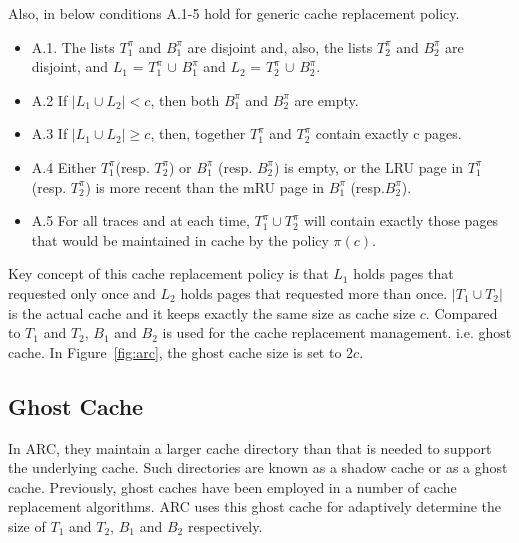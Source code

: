  
 Also, in below conditions A.1-5 hold for generic cache replacement policy.
 \vspace{0.2cm}
 \begin{itemize}
     \item A.1. The lists $T_1^\pi$ and $B_1^\pi$ are disjoint and, also, the lists $T_2^\pi$ and $B_2^\pi$ are disjoint, and 
     $L_1$ = $T_1^\pi$ $\cup$ $B_1^\pi$ and $L_2$ = $T_2^\pi$ $\cup$ $B_2^\pi$.
 \end{itemize}

\begin{itemize}
    \item A.2 If $|L_1 \cup L_2| < c$, then both $B_1^\pi$ and $B_2^\pi$ are empty.
\end{itemize}

\begin{itemize}
    \item A.3 If $|L_1 \cup L_2 | \geq c$, then, together $T_1^\pi$ and $T_2^\pi$ contain exactly c pages. 
\end{itemize}

\begin{itemize}
    \item A.4 Either $T_1^\pi$(resp. $T_2^\pi$) or $B_1^\pi$ (resp. $B_2^\pi$) is empty, or the LRU page in $T_1^\pi$ (resp. $T_2^\pi$) is more recent than the mRU page in $B_1^\pi$ (resp.$B_2^\pi$).
\end{itemize}

\begin{itemize}
    \item A.5 For all traces and at each time, $T_1^\pi \cup T_2^\pi$ will contain exactly those pages that would be maintained in cache by the policy $\pi(c)$.
\end{itemize}

 Key concept of this cache replacement policy is that $L_1$ holds pages that requested only once and $L_2$ holds pages that requested more than once. $|T_1 \cup T_2|$ is the actual cache and it keeps exactly the same size as cache size $c$. Compared to $T_1$ and $T_2$, $B_1$ and $B_2$ is used for the cache replacement management. i.e. ghost cache. In Figure~\ref{fig:arc}, the ghost cache size is set to $2c$.

\subsection{Ghost Cache}
In ARC, they maintain a larger cache directory than that is needed to support the underlying cache. Such directories are known as a shadow cache or as a ghost cache. Previously, ghost caches have been employed in a number of cache replacement algorithms. ARC uses this ghost cache for adaptively determine the size of $T_1$ and $T_2$, $B_1$ and $B_2$ respectively. 

